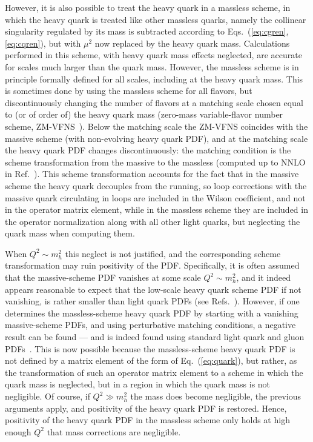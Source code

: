 However, it is also possible to treat the heavy quark in a massless \msbar{}
scheme, in which the heavy quark is treated like other massless
quarks, namely the collinear singularity regulated by its mass is
subtracted  according to Eqs.~(\ref{eq:cgren},\ref{eq:cqren}), but with
$\mu^2$ now replaced by the heavy quark mass. Calculations performed
in this scheme, with heavy quark mass effects neglected, are accurate
for scales much larger than the quark mass.  
However,  the massless scheme is in principle formally defined for all scales,
including at the heavy quark mass. This is sometimes done by using the
massless scheme for all flavors, but discontinuously changing the
number of flavors at a matching scale chosen equal to (or of order of) the
heavy quark mass (zero-mass variable-flavor number scheme,
ZM-VFNS~\cite{Aivazis:1993pi}). Below the matching scale the ZM-VFNS
coincides with the massive scheme (with non-evolving heavy quark PDF),
and at the matching scale the heavy quark PDF
changes discontinuously:  the matching condition is the scheme transformation
from the massive to the massless \msbar{} (computed up to NNLO in
Ref.~\cite{Buza:1996wv}). This scheme transformation accounts for the
fact that in the massive scheme the heavy quark decouples from the
running, so
loop corrections with the massive
quark circulating in loops are included in the Wilson coefficient,
and not in the operator matrix element, while in the massless scheme
they are included in the operator normalization along with all other
light quarks, but neglecting the quark mass when computing them.

When $Q^2\sim m_h^2$ this neglect is not justified, and the corresponding
scheme transformation may ruin positivity of the PDF. Specifically, it
is often assumed that the massive-scheme PDF vanishes at some scale  $Q^2\sim m_h^2$,
and it indeed appears
reasonable to expect that the low-scale heavy quark scheme PDF if not vanishing, is rather smaller than
light quark PDFs (see
Refs.~\cite{Ball:2015dpa,Ball:2016neh}). However, if one determines the 
massless-scheme
heavy quark PDF by starting with a vanishing massive-scheme PDFs, and
using perturbative  matching conditions, a negative result can be found
--- and is 
indeed found using standard light quark and gluon
PDFs~\cite{Ball:2017nwa}. This is now possible because the
massless-scheme heavy quark
PDF is not defined by a matrix element of the form of
Eq.~(\ref{eq:quark}), but rather, as the transformation of such an
operator matrix element to a scheme in which the quark mass is
neglected, but in a region in which the quark mass is not negligible.
Of course, if  $Q^2\gg m_h^2$ the mass does become negligible, the
previous arguments apply, and
positivity of the heavy quark PDF is restored. Hence, positivity of
the heavy quark PDF in the massless scheme only holds at high enough
$Q^2$ that mass corrections are negligible.
 
